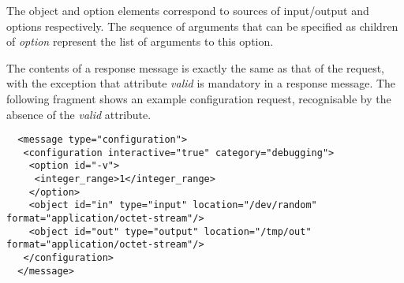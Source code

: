 \documentclass{article}
\begin{document}
   \noindent The object and option elements correspond to sources of
   input/output and options respectively. The sequence of arguments that can be
   specified as children of \textit{option} represent the list of arguments to
   this option.

   The contents of a response message is exactly the same as that of the
   request, with the exception that attribute \textit{valid} is mandatory in a
   response message. The following fragment shows an example configuration
   request, recognisable by the absence of the \textit{valid} attribute.

   \small \begin{verbatim}
  <message type="configuration">
   <configuration interactive="true" category="debugging">
    <option id="-v">
     <integer_range>1</integer_range>
    </option>
    <object id="in" type="input" location="/dev/random" format="application/octet-stream"/>
    <object id="out" type="output" location="/tmp/out" format="application/octet-stream"/>
   </configuration>
  </message>\end{verbatim}
  \normalsize

   
\end{document}
